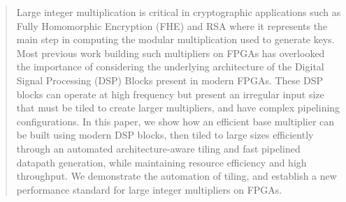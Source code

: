 \documentclass[conference]{IEEEtran}
\begin{document}
\begin{abstract}
Large integer multiplication is critical in cryptographic applications such as Fully Homomorphic Encryption (FHE) and RSA where it represents the main step in computing the modular multiplication used to generate keys.
Most previous work building such multipliers on FPGAs has overlooked the importance of considering the underlying architecture of the Digital Signal Processing (DSP) Blocks present in modern FPGAs. 
These DSP blocks can operate at high frequency but present an irregular input size that must be tiled to create larger multipliers, and have complex pipelining configurations.
In this paper, we show how an efficient base multiplier can be built using modern DSP blocks, then tiled to large sizes efficiently through an automated architecture-aware tiling and fast pipelined datapath generation, while maintaining resource efficiency and high throughput.
We demonstrate the automation of tiling, and establish a new performance standard for large integer multipliers on FPGAs.
\end{abstract}

%
\IEEEpeerreviewmaketitle
\end{document}
